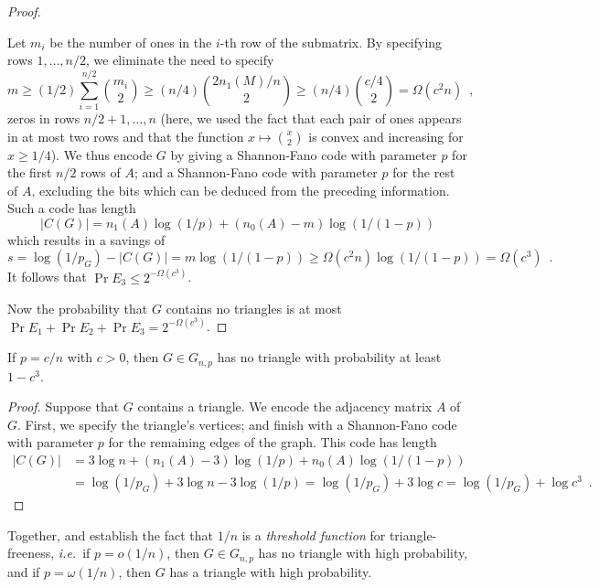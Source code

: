 \documentclass[format=acmsmall, review=false, screen=true]{acmart}
\begin{document}
\begin{proof}
\begin{enumerate}
    Let $m_i$ be the number of ones in the $i$-th row of the
    submatrix.  By specifying rows $1,\ldots,n/2$, we eliminate the
    need to specify
    \[
      m \geq (1/2)\sum_{i=1}^{n/2}\binom{m_i}{2} \ge (n/4) \binom{2
        n_1(M)/n}{2} \ge (n/4)\binom{c/4}{2} = \varOmega(c^2n) \enspace ,
    \]
    zeros in rows $n/2+1,\ldots,n$ (here, we used the fact that each
    pair of ones appears in at most two rows and that the
    function $x \mapsto \binom{x}{2}$ is convex and increasing for 
    $x \geq 1/4$).
    We thus encode $G$ by giving a
    Shannon-Fano code with parameter $p$ for the first $n/2$ rows of
    $A$; and a Shannon-Fano code with parameter $p$ for the rest of
    $A$, excluding the bits which can be deduced from the preceding
    information. Such a code has length
    \[
      |C(G)| = n_1(A) \log(1/p) + (n_0(A)-m)\log(1/(1-p))
    \]
    which results in a savings of
    \[
      s = \log(1/p_G) - |C(G)| = m\log(1/(1-p)) \ge
      \varOmega(c^2n)\log(1/(1-p)) = \varOmega(c^3) \enspace . 
    \]
    It follows that $\Pr E_3 \leq 2^{-\varOmega(c^3)}$.
  \end{enumerate}
  Now the probability that $G$ contains no triangles is at most
  $\Pr E_1 + \Pr E_2 + \Pr E_3 = 2^{-\varOmega(c^3)}$. 
\end{proof}

\begin{thm}
  If $p = c/n$ with $c > 0$, then $G \in G_{n, p}$ 
  has no triangle with
  probability at least $1 - c^3$.
\end{thm}
\begin{proof}
  Suppose that $G$ contains a triangle. We encode the adjacency matrix
  $A$ of $G$. First, we specify the triangle's vertices; and finish
  with a Shannon-Fano code with parameter $p$ for the remaining
  edges of the graph. This code has length
  \begin{align*}
    |C(G)| &= 3 \log n + (n_1(A) - 3) \log (1/p) + n_0(A) \log (1/(1 - p))\\ 
           &= \log (1/p_G) + 3 \log n - 3 \log (1/p) 
           = \log (1/p_G) + 3 \log c
           = \log (1/p_G) + \log c^3 \enspace . 
  \end{align*}
\end{proof}

Together,  and  establish
the fact that $1/n$ is a \emph{threshold function} for
triangle-freeness, \emph{i.e.}~if $p = o(1/n)$, then $G \in G_{n, p}$
has no triangle with high probability, and if $p = \omega(1/n)$, then
$G$ has a triangle with high probability. 
\end{document}
